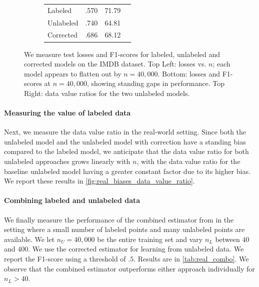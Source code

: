 \begin{figure}
\begin{subfigure}{.48\textwidth}
{\begin{tabular}{lccr}
      \hline
      Labeled & .570 & 71.79 \\
      Unlabeled & .740 & 64.81 \\
      Corrected & .686 & 68.12 \\
      \hline
      \end{tabular}
      }
    \end{subfigure}
    \fi
    \caption{We measure test losses and F1-scores for labeled, unlabeled and corrected models on the IMDB dataset. Top Left: losses vs. $n$; each model appears to flatten out by $n=40,000$.  Bottom: losses and F1-scores at $n=40,000$, showing standing gaps in performance. Top Right: data value ratios for the two unlabeled models.}
    \label{fig:real_biases_data_value_ratio}
\end{figure}

\vspace{-0.5em}
\paragraph{Measuring the value of labeled data} Next, we measure the data value ratio in the real-world setting. Since both the unlabeled model and the unlabeled model with correction have a standing bias compared to the labeled model, we anticipate that the data value ratio for both unlabeled approaches grows linearly with $n$, with the data value ratio for the baseline unlabeled model having a greater constant factor due to its higher bias. We report these results in \autoref{fig:real_biases_data_value_ratio}.


\vspace{-0.5em}
\paragraph{Combining labeled and unlabeled data} We finally measure the performance of the combined estimator from \cite{GreenStrawderman2001} in the setting where a small number of labeled points and many unlabeled points are available. We let $n_U=40,000$ be the entire training set and vary $n_L$ between $40$ and $400$. We use the corrected estimator for learning from unlabeled data. We report the F1-score using a threshold of $.5$. Results are in \autoref{tab:real_combo}. We observe that the combined estimator outperforms either approach individually for $n_L>40$.

